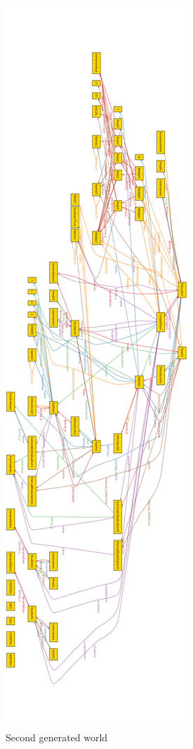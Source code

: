 \begin{figure}[H]
    \centering
    \includegraphics[height=\textheight]{Images/alloy/alloy_gen_02.png}
    \caption{Second generated world}
\end{figure}
